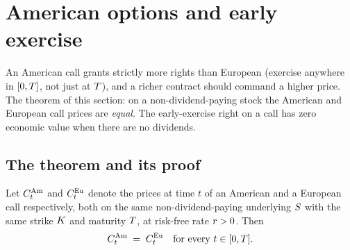 \section{American options and early exercise}
\label{sec:ch14_american}

An American call grants strictly more rights than European
(exercise anywhere in $[0, T]$, not just at $T$), and a
richer contract should command a higher price. The theorem of
this section: on a non-dividend-paying stock the American and
European call prices are \emph{equal}. The early-exercise right
on a call has zero economic value when there are no dividends.

\subsection{The theorem and its proof}
\label{sec:ch14_amer_proof}

\begin{theorem}[American call $=$ European call, no dividends]
\label{thm:american_eq_european}
Let $C^{\mathrm{Am}}_t$ and $C^{\mathrm{Eu}}_t$ denote
the prices at time $t$ of an American and a European call
respectively, both on the same non-dividend-paying underlying
$S$ with the same strike $K$ and maturity $T$, at
risk-free rate $r > 0$. Then
\begin{equation*}
  C^{\mathrm{Am}}_t \;=\; C^{\mathrm{Eu}}_t
  \quad\text{for every } t \in [0, T].
\end{equation*}
\end{theorem}


